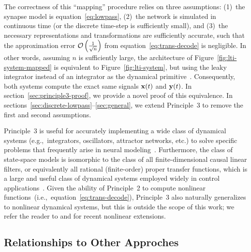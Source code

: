 The correctness of this ``mapping'' procedure relies on three assumptions: (1)~the synapse model is equation~\ref{eq:lowpass}, (2)~the network is simulated in continuous time (or the discrete time-step is sufficiently small), and (3)~the necessary representations and transformations are sufficiently accurate, such that the approximation error $\mathcal{O}\left({ \frac{1}{\sqrt{n}} }\right)$ from equation~\ref{eq:trans-decode} is negligible.
In other words, assuming $n$ is sufficiently large, the architecture of Figure~\ref{fig:lti-system-mapped} is equivalent to Figure~\ref{fig:lti-system}, but using the leaky integrator instead of an integrator as the dynamical primitive~\citep{eliasmith2003a}.
Consequently, both systems compute the exact same signals $\mathbf{x}(t)$ and $\mathbf{y}(t)$.
In section~\ref{sec:principle3-proof}, we provide a novel proof of this equivalence.
In sections~\ref{sec:discrete-lowpass}--\ref{sec:general}, we extend Principle~3 to remove the first and second assumptions.

Principle~3 is useful for accurately implementing a wide class of dynamical systems (e.g.,~integrators, oscillators, attractor networks, etc.) to solve specific problems that frequently arise in neural modeling~\citep[e.g.,][]{eliasmith2000b, singh2004, eliasmith2005b, singh2006}.
Furthermore, the class of state-space models is isomorphic to the class of all finite-dimensional causal linear filters, or equivalently all rational (finite-order) proper transfer functions, which is a large and useful class of dynamical systems employed widely in control applications~\citep{brogan1982modern}.
Given the ability of Principle~2 to compute nonlinear functions~(i.e.,~equation~\ref{eq:trans-decode}), Principle~3 also naturally generalizes to nonlinear dynamical systems, but this is outside the scope of this work; we refer the reader to \citet{voelker2017iscas} and \citet{voelker2017neuromorphic} for recent nonlinear extensions.

\subsection{Relationships to Other Approches}

